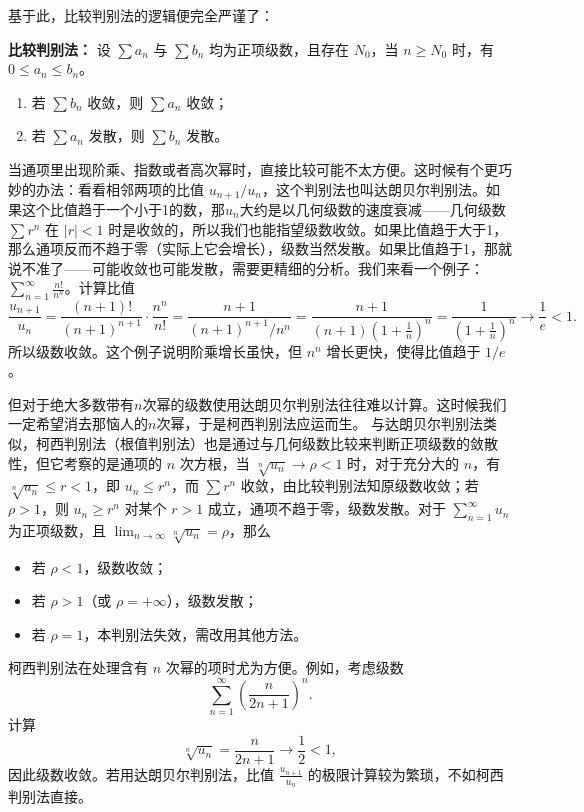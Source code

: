 \documentclass[UTF8]{ctexbook}
\begin{document}
基于此，比较判别法的逻辑便完全严谨了：

\textbf{比较判别法：} 设 $\sum a_n$ 与 $\sum b_n$ 均为正项级数，且存在 $N_0$，当 $n \ge N_0$ 时，有 $0 \le a_n \le b_n$。
\begin{enumerate}
    \item 若 $\sum b_n$ 收敛，则 $\sum a_n$ 收敛；
    \item 若 $\sum a_n$ 发散，则 $\sum b_n$ 发散。
\end{enumerate}




当通项里出现阶乘、指数或者高次幂时，直接比较可能不太方便。这时候有个更巧妙的办法：看看相邻两项的比值 $u_{n+1}/u_n$，这个判别法也叫达朗贝尔判别法。如果这个比值趋于一个小于1的数，那$u_n$大约是以几何级数的速度衰减——几何级数 $\sum r^n$ 在 $|r|<1$ 时是收敛的，所以我们也能指望级数收敛。如果比值趋于大于1，那么通项反而不趋于零（实际上它会增长），级数当然发散。如果比值趋于1，那就说不准了——可能收敛也可能发散，需要更精细的分析。我们来看一个例子：$\sum_{n=1}^{\infty} \frac{n!}{n^n}$。计算比值
\[
\frac{u_{n+1}}{u_n} = \frac{(n+1)!}{(n+1)^{n+1}} \cdot \frac{n^n}{n!} = \frac{n+1}{(n+1)^{n+1}/n^n} = \frac{n+1}{(n+1)\left(1+\frac{1}{n}\right)^n} = \frac{1}{\left(1+\frac{1}{n}\right)^n} \to \frac{1}{e} < 1.
\]
所以级数收敛。这个例子说明阶乘增长虽快，但 $n^n$ 增长更快，使得比值趋于 $1/e$。

但对于绝大多数带有$n$次幂的级数使用达朗贝尔判别法往往难以计算。这时候我们一定希望消去那恼人的$n$次幂，于是柯西判别法应运而生。
与达朗贝尔判别法类似，柯西判别法（根值判别法）也是通过与几何级数比较来判断正项级数的敛散性，但它考察的是通项的 $n$ 次方根，当 $\sqrt[n]{u_n} \to \rho < 1$ 时，对于充分大的 $n$，有 $\sqrt[n]{u_n} \le r < 1$，即 $u_n \le r^n$，而 $\sum r^n$ 收敛，由比较判别法知原级数收敛；若 $\rho > 1$，则 $u_n \ge r^n$ 对某个 $r>1$ 成立，通项不趋于零，级数发散。对于 $\sum_{n=1}^{\infty} u_n$ 为正项级数，且 $\lim_{n\to\infty} \sqrt[n]{u_n} = \rho$，那么
\begin{itemize}
    \item 若 $\rho < 1$，级数收敛；
    \item 若 $\rho > 1$（或 $\rho = +\infty$），级数发散；
    \item 若 $\rho = 1$，本判别法失效，需改用其他方法。
\end{itemize}

柯西判别法在处理含有 $n$ 次幂的项时尤为方便。例如，考虑级数
\[
\sum_{n=1}^{\infty} \left( \frac{n}{2n+1} \right)^{\!n}.
\]
计算
\[
\sqrt[n]{u_n} = \frac{n}{2n+1} \to \frac{1}{2} < 1,
\]
因此级数收敛。若用达朗贝尔判别法，比值 $\frac{u_{n+1}}{u_n}$ 的极限计算较为繁琐，不如柯西判别法直接。
\end{document}
